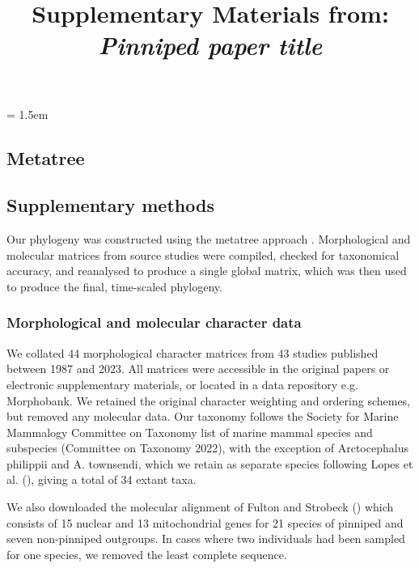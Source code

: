 \documentclass[a4paper, 12pt]{article}
\title{Supplementary Materials from: \textit{Pinniped paper title}}
\author{}
\date{}
\begin{document}
\maketitle

\tableofcontents

\parindent = 1.5em
\addtolength{\parskip}{.3em}

\newpage
\begin{landscape}
\section{Metatree}

\subsection{Supplementary methods}

Our phylogeny was constructed using the metatree approach \citep{lloyd2021total,lloyd2016probabilistic}. Morphological and molecular matrices from source studies were compiled, checked for taxonomical accuracy, and reanalysed to produce a single global matrix, which was then used to produce the final, time-scaled phylogeny. 

\subsubsection{Morphological and molecular character data}

We collated 44 morphological character matrices from 43 studies published between 1987 and 2023. All matrices were accessible in the original papers or electronic supplementary materials, or located in a data repository e.g. Morphobank. We retained the original character weighting and ordering schemes, but removed any molecular data. Our taxonomy follows the Society for Marine Mammalogy Committee on Taxonomy list of marine mammal species and subspecies (Committee on Taxonomy 2022), with the exception of Arctocephalus philippii and A. townsendi, which we retain as separate species following Lopes et al. (\citeyear{lopes2021phylogenomic}), giving a total of 34 extant taxa.

We also downloaded the molecular alignment of Fulton and Strobeck (\citeyear{fulton2010multiple}) which consists of 15 nuclear and 13 mitochondrial genes for 21 species of pinniped and seven non-pinniped outgroups. In cases where two individuals had been sampled for one species, we removed the least complete sequence.


\end{landscape}
\end{document}
